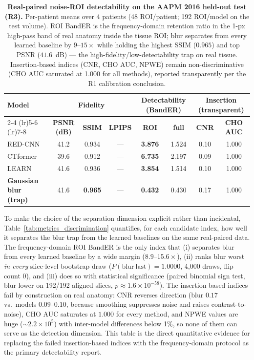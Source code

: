 \documentclass[twoside,11pt]{article}
\begin{document}
\begin{table}[ht]
    \centering
    \small
    \setlength{\tabcolsep}{4pt}
    \begin{tabular}{lccccccc}
        \toprule
        \multirow{2}{*}{\textbf{Model}} & \multicolumn{3}{c}{\textbf{Fidelity}} & \multicolumn{2}{c}{\textbf{Detectability (BandER)}} & \multicolumn{2}{c}{\textbf{Insertion (transparent)}} \\
        \cmidrule(lr){2-4} \cmidrule(lr){5-6} \cmidrule(lr){7-8}
        & \textbf{PSNR (dB)} & \textbf{SSIM} & \textbf{LPIPS} & \textbf{ROI} & \textbf{full} & \textbf{CNR} & \textbf{CHO AUC} \\
        \midrule
        RED-CNN   & 41.2 & 0.934 & --- & \textbf{3.876} & 1.524 & 0.10 & 1.000 \\
        CTformer  & 39.6 & 0.912 & --- & \textbf{6.735} & 2.197 & 0.09 & 1.000 \\
        LEARN     & 41.6 & 0.936 & --- & \textbf{3.854} & 1.514 & 0.10 & 1.000 \\
        \textbf{Gaussian blur (trap)} & 41.6 & \textbf{0.965} & --- & \textbf{0.432} & 0.430 & 0.17 & 1.000 \\
        \bottomrule
    \end{tabular}
    \caption{\textbf{Real-paired noise-ROI detectability on the AAPM 2016 held-out test (R3).} Per-patient means over 4 patients (48 ROI/patient; 192 ROI/model on the test volume). ROI BandER is the frequency-domain retention ratio in the 1-px high-pass band of real anatomy inside the tissue ROI; blur separates from every learned baseline by $9$--$15\times$ while holding the highest SSIM ($0.965$) and top PSNR ($41.6$~dB) --- the high-fidelity/low-detectability trap on real tissue. Insertion-based indices (CNR, CHO AUC, NPWE) remain non-discriminative (CHO AUC saturated at 1.000 for all methods), reported transparently per the R1 calibration conclusion.}
    \label{tab:aapm_r3_roi_detectability}
\end{table}

To make the choice of the separation dimension explicit rather than incidental, Table~\ref{tab:metrics_discrimination} quantifies, for each candidate index, how well it separates the blur trap from the learned baselines on the same real-paired data. The frequency-domain ROI BandER is the only index that (i) separates blur from every learned baseline by a wide margin ($8.9$--$15.6\times$), (ii) ranks blur worst \emph{in every} slice-level bootstrap draw ($P(\mathrm{blur~last})=1.0000$, 4{,}000 draws, flip count 0), and (iii) does so with statistical significance (paired binomial sign test, blur lower on 192/192 aligned slices, $p\approx1.6\times10^{-58}$). The insertion-based indices fail by construction on real anatomy: CNR reverses direction (blur $0.17$ vs.\ models $0.09$--$0.10$, because smoothing suppresses noise and raises contrast-to-noise), CHO AUC saturates at $1.000$ for every method, and NPWE values are huge ($\sim2.2\times10^{5}$) with inter-model differences below 1\%, so none of them can serve as the detection dimension. This table is the direct quantitative evidence for replacing the failed insertion-based indices with the frequency-domain protocol as the primary detectability report.
\end{document}
